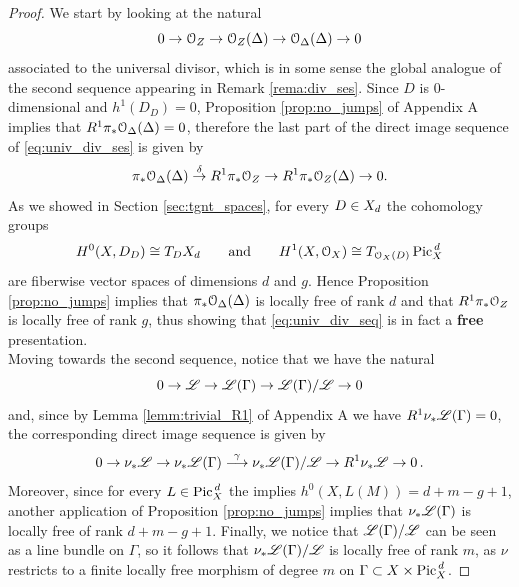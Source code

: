 		\begin{proof}
			We start by looking at the natural \ses
			\begin{equation}\label{eq:univ_div_ses}
				0 \to \mathcal{O}_Z \to \mathcal{O}_Z(\Delta) \to \mathcal{O}_\Delta(\Delta) \to 0 
			\end{equation}
			associated to the universal divisor, which is in some sense the global analogue of the second sequence appearing in Remark \ref{rema:div_ses}. Since $D$ is $0$-dimensional and $h^1(D_D)= 0$, Proposition \ref{prop:no_jumps} of Appendix A implies that $R^1 \pi_* \mathcal{O}_{\Delta}(\Delta) = 0$, therefore the last part of the direct image sequence of \ref{eq:univ_div_ses} is given by
			$$
				\pi_* \mathcal{O}_{\Delta}(\Delta)\overset{\delta}\to R^1 \pi_* \mathcal{O}_Z \to R^1 \pi_* \mathcal{O}_Z(\Delta) \to 0.
			$$
			As we showed in Section \ref{sec:tgnt_spaces}, for every $D\in X_d$ the cohomology groups
			$$ H^0(X, D_D) \cong T_D X_d \qquad \text{and} \qquad H^1(X, \mathcal{O}_X) \cong T_{\mathcal{O}_X(D)} \operatorname{Pic}^{\,d}_X $$
			are fiberwise vector spaces of dimensions $d$ and $g$. Hence Proposition \ref{prop:no_jumps} implies that $\pi_* \mathcal{O}_{\Delta}(\Delta)$ is locally free of rank $d$ and that $R^1 \pi_* \mathcal{O}_Z$ is locally free of rank $g$, thus showing that \eqref{eq:univ_div_seq} is in fact a \textbf{free} presentation.
			\\
			Moving towards the second sequence, notice that we have the natural \ses 
			\begin{equation}\label{eq:univ_lb_ses}
				0 \to \mathscr{L} \to \mathscr{L}(\Gamma) \to \mathscr{L}(\Gamma)/\mathscr{L} \to 0 
			\end{equation}
			and, since by Lemma \ref{lemm:trivial_R1} of Appendix A we have $R^1 \nu_{*} \mathscr{L}(\Gamma) = 0$, the corresponding direct image sequence is given by
			\begin{equation}\label{eq:univ_lb_direct_image}
				0 \to \nu_{*}\mathscr{L} \to \nu_{*} \mathscr{L}(\Gamma)\overset{\gamma}{\longrightarrow} \nu_{*} \mathscr{L}(\Gamma) / \mathscr{L} \to R^1 \nu_{*} \mathscr{L} \to 0 \,.
			\end{equation}
			Moreover, since for every $L\in \operatorname{Pic}^{\,d}_X$ the \RR implies $h^0(X, L(M)) = d+m-g+1 $, another application of Proposition \ref{prop:no_jumps} implies that  $\nu_{*} \mathscr{L}(\Gamma)$ is locally free of rank $d+m-g+1$. 
			Finally, we notice that $\mathscr{L}(\Gamma) / \mathscr{L}$ can be seen as a line bundle on $\Gamma$, so it follows that $\nu_{*} \mathscr{L}(\Gamma) / \mathscr{L}$ is locally free of rank $m$, as $\nu$ restricts to a finite locally free morphism of degree $m$ on $\Gamma\subset X\times \operatorname{Pic}^{\,d}_X$.
		\end{proof}

